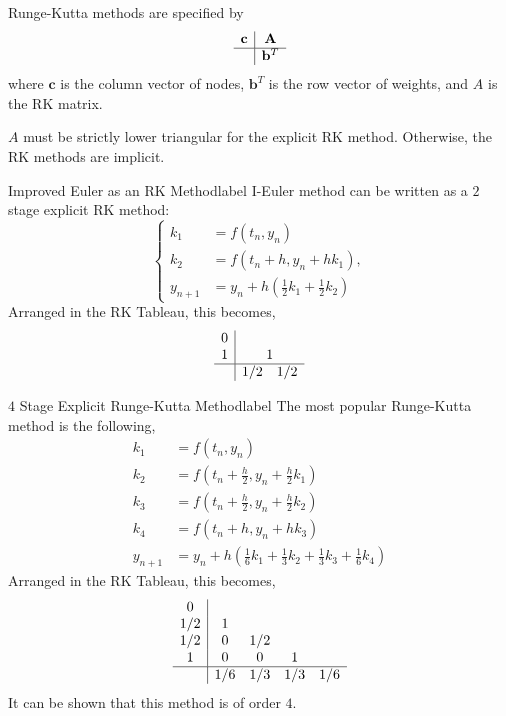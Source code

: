 \begin{rmk}
	Runge-Kutta methods are specified by
	\[\begin{array}{c|c}
	\mathbf{c} & \mathbf{A} \\
	\hline & \mathbf{b}^{T}
	\end{array}\]
	where $\mathbf{c}$ is the column vector of nodes, $\mathbf{b}^T$ is the row vector of weights, and $A$ is the RK matrix.
\end{rmk}

\begin{cor}
	$A$ must be strictly lower triangular for the explicit RK method. Otherwise, the RK methods are implicit.
\end{cor}

\begin{ex}{Improved Euler as an RK Method}{label}
	I-Euler method can be written as a $2$ stage explicit RK method:
	\[
		\left\{\begin{aligned}
	k_1 &=f\left(t_n, y_n\right) \\
	k_2 &=f\left(t_n+h, y_n+h k_1\right), \\
	y_{n+1} &=y_n+h\left(\frac{1}{2} k_1+\frac{1}{2} k_2\right)
	\end{aligned}\right.
	\]
	Arranged in the RK Tableau, this becomes,
	\[\begin{array}{c|c}
	0 &  \\
	1 &  1 \\
	\hline & 1/2 \quad 1/2
	\end{array}\]
\end{ex}

\begin{ex}{$4$ Stage Explicit Runge-Kutta Method}{label}
	The most popular Runge-Kutta method is the following,
	\begin{align*}
	k_1 &=f\left(t_n, y_n\right) \\
	k_2 &=f\left(t_n+\frac{h}{2}, y_n+\frac{h}{2} k_1\right) \\
	k_3 &=f\left(t_n+\frac{h}{2}, y_n+\frac{h}{2} k_2\right) \\
	k_4 &=f\left(t_n+h, y_n+h k_3\right) \\
	y_{n+1} &=y_n+h\left(\frac{1}{6} k_1+\frac{1}{3} k_2+\frac{1}{3} k_3+\frac{1}{6} k_4\right)
	\end{align*}
	Arranged in the RK Tableau, this becomes,
	\[\begin{array}{c|cccc}
	0 & & & \\
	1/2 &  1 & & \\
	1/2 & 0 & 1/2 & \\
	1 & 0 & 0 & 1 \\
	\hline
	& 1/6 & 1/3 & 1/3 & 1/6
	\end{array}\]
	It can be shown that this method is of order $4$.
\end{ex}

